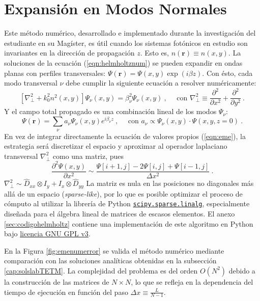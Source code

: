 \section{Expansión en Modos Normales \label{cap:eme}}
Este método numérico, desarrollado e implementado durante la investigación del estudiante en su Magíster, es útil cuando los sistemas fotónicos en estudio son invariantes en la dirección de propagación $z$. Esto es, $n(\textbf{r})\equiv n(x,y)$. La soluciones de la ecuación (\ref{eqn:helmholtznum}) se pueden expandir en ondas planas con perfiles transversales: $\Psi(\textbf{r}) = \Psi(x,y) \exp({i\beta z})$. Con ésto, cada modo transversal $\nu$ debe cumplir la siguiente ecuación a resolver numéricamente:
\begin{equation}
	\left[\nabla_\perp^2 + k_0^2 n^2(x,y)\right]\Psi_\nu(x,y) = \beta_\nu^2\Psi_\nu(x,y) \ , \quad\text{ con } \nabla_\perp^2 \equiv \frac{\partial^2}{\partial x^2} + \frac{\partial^2}{\partial y^2} \ .
	\label{eqn:eme}
\end{equation}
Y el campo total propagado es una combinación lineal de los modos $\Psi_\nu$: 
\begin{equation}
	\Psi(\textbf{r}) = \sum_\nu a_\nu \Psi_\nu(x,y) e^{i\beta_\nu z} \ , \quad\text{ con } a_\nu \propto \Psi_\nu(x,y) \cdot \Psi(x, y, z=0) \ . \label{eqn:emedin}
\end{equation}
En vez de integrar directamente la ecuación de valores propios (\ref{eqn:eme}), la estrategia será discretizar el espacio y aproximar al operador laplaciano transversal $\nabla_\perp^2$ como una matriz, pues $$\frac{\partial^2 \Psi(x,y)}{\partial x^2} \sim \frac{\Psi[i+1,j]-2\Psi[i,j]+\Psi[i-1,j]}{\Delta x ^2}  \ .
$$
$\nabla^2_\perp \sim \hat{D}_{xx} \otimes I_y + I_x \otimes \hat{D}_{yy}$
La matriz es nula en las posiciones no diagonales más allá de un espacio (\textit{sparse-like}), por lo que es posible optimizar el proceso de cómputo al utilizar la librería de Python \href{https://docs.scipy.org/doc/scipy/reference/sparse.linalg.html}{\color{magenta}\texttt{scipy.sparse.linalg}}, especialmente diseñada para el álgebra lineal de matrices de escasos elementos. El anexo \ref{sec:codigohelmholtz} contiene una implementación de este algoritmo en Python bajo \href{https://www.gnu.org/licenses/gpl-3.0.html}{\color{magenta}licencia GNU GPL v3}.

En la Figura \ref{fig:emenumerror} se valida el método numérico mediante comparación con las soluciones analíticas obtenidas en la subsección \ref{cap:solslabTETM}. La complejidad del problema es del orden $O(N^2)$ debido a la construcción de las matrices de $N\times N$, lo que se refleja en la dependencia del tiempo de ejecución en función del paso $\Delta x \equiv \frac{L}{N-1}$.


